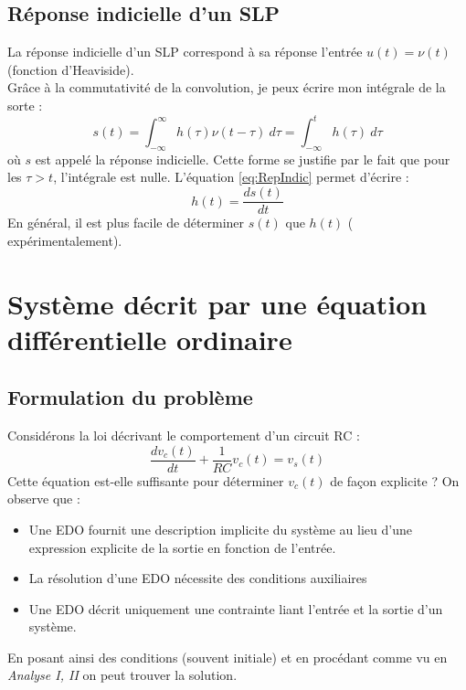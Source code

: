 	\subsection{Réponse indicielle d'un SLP}
	La réponse indicielle d'un SLP correspond à sa réponse l'entrée $u(t) = \nu
	(t)$ (fonction d'Heaviside).\\
	Grâce à la commutativité de la convolution, je peux écrire mon intégrale de
	la sorte :
	\begin{equation}
	s(t) = \int_{-\infty}^\infty h(\tau)\nu(t-\tau)\ d\tau = \int_{-\infty}^t h(
	\tau)\ d\tau
	\label{eq:RepIndic}
	\end{equation}
	où $s$ est appelé la réponse indicielle. Cette forme se justifie par le fait que 
	pour les $\tau > t$, l'intégrale est nulle. L'équation \autoref{eq:RepIndic} 
	permet d'écrire :
	\begin{equation}
	h(t) = \frac{ds(t)}{dt}
	\end{equation}
	En général, il est plus facile de déterminer $s(t)$ que $h(t)$ (
	expérimentalement).


\section{Système décrit par une équation différentielle ordinaire}
	\subsection{Formulation du problème}
	Considérons la loi décrivant le comportement d'un circuit RC :
	\begin{equation}
	\frac{dv_c(t)}{dt}+\frac{1}{RC}v_c(t) = v_s(t)
	\end{equation}		
	Cette équation est-elle suffisante pour déterminer $v_c(t)$ de façon 
	explicite ? On observe que :
	\begin{itemize}
	\item Une EDO fournit une description implicite du système au lieu d'une 
	expression explicite de la sortie en fonction de l'entrée.
	\item La résolution d'une EDO nécessite des conditions auxiliaires
	\item Une EDO décrit uniquement une contrainte liant l'entrée et la
	sortie d'un système.
	\end{itemize}
	En posant ainsi des conditions (souvent initiale) et en procédant 
	comme vu en \textit{Analyse I, II} on peut trouver la solution.
	
